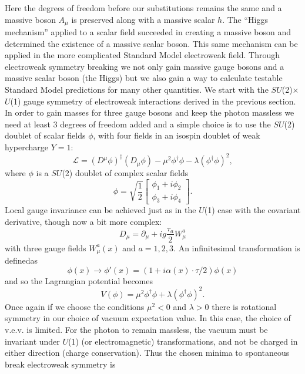 Here the degrees of freedom before our substitutions remains the same and a massive boson $A_\mu$ is preserved along with a massive scalar $h$. The ``Higgs mechanism'' applied to a scalar field succeeded in creating a massive boson and determined the existence of a massive scalar boson. This same mechanism can be applied in the more complicated Standard Model electroweak field. Through electroweak symmetry breaking we not only gain massive gauge bosons and a massive scalar boson (the Higgs) but we also gain a way to calculate testable Standard Model predictions for many other quantities. We start with the $SU$(2)$\times$$U$(1) gauge symmetry of electroweak interactions derived in the previous section. In order to gain masses for three gauge bosons and keep the photon massless we need at least 3 degrees of freedom added and a simple choice is to use the $SU$(2) doublet of scalar fields $\phi$, with four fields in an isospin doublet of weak hypercharge $Y=1$: 
\begin{equation}
\mathcal{L} =(D^\mu \phi)^\dagger(D_\mu\phi)-\mu^2\phi^\dagger\phi-\lambda(\phi^\dagger\phi)^2,
\end{equation}
where $\phi$ is a $SU$(2) doublet of complex scalar fields
\begin{equation}
\phi = \sqrt{\frac{1}{2}}\begin{bmatrix}
	\phi_1+i\phi_2  \\
	\phi_3+i\phi_4
	\end{bmatrix} .
\end{equation}
Local gauge invariance can be achieved just as in the $U$(1) case with the covariant derivative, though now a bit more complex:
\begin{equation}
D_\mu = \partial_\mu + ig \frac{\tau_a}{2}W_\mu^a
\end{equation}
with three gauge fields $W_\mu^a(x)$ and $a=1,2,3$. An infinitesimal transformation is definedas 
\begin{equation}
\phi(x)\rightarrow \phi'(x) = (1+i\alpha(x)\cdot\tau/2)\phi(x)
\end{equation}
and so the Lagrangian potential becomes
\begin{equation}
V(\phi) = \mu^2\phi^\dagger\phi+\lambda(\phi^\dagger\phi)^2.
\end{equation}
Once again if we choose the conditions $\mu^2<0$ and $\lambda>0$ there is rotational symmetry in our choice of vacuum expectation value. In this case, the choice of v.e.v. is limited. For the photon to remain massless, the vacuum must be invariant under $U$(1) (or electromagnetic) transformations, and not be charged in either direction (charge conservation). Thus the chosen minima to spontaneous break electroweak symmetry is
$$
